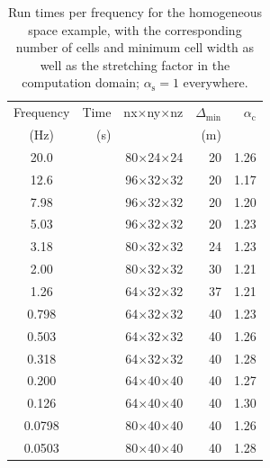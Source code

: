 \documentclass[onecolumn,extra,referee,camera]{gji}
\newlength{\twidth}
\newcommand{\mr}[1]{\mathrm{#1}}
\begin{document}
\begin{table}
\begin{minipage}{\twidth}
  \centering
  \caption{Run times per frequency for the homogeneous space example, with the
    corresponding number of cells and minimum cell width as well as the
    stretching factor in the computation domain; $\alpha_\mr{s}=1$ everywhere.}
  \label{tbl:timefull}
  \begin{tabular}{S[table-format=2.4]rrrr}
    \toprule
    {Frequency} & Time & nx$\times$ny$\times$nz & $\Delta_\mr{min}$ & $\alpha_\mr{c}$ \\
    {(Hz)}  & (s) &  & (m) & \\
    \midrule
    20.0    & & 80$\times$24$\times$24 & 20 & 1.26 \\
    12.6    & & 96$\times$32$\times$32 & 20 & 1.17 \\
     7.98   & & 96$\times$32$\times$32 & 20 & 1.20 \\
     5.03   & & 96$\times$32$\times$32 & 20 & 1.23 \\
     3.18   & & 80$\times$32$\times$32 & 24 & 1.23 \\
     2.00   & & 80$\times$32$\times$32 & 30 & 1.21 \\
     1.26   & & 64$\times$32$\times$32 & 37 & 1.21 \\
     0.798  & & 64$\times$32$\times$32 & 40 & 1.23 \\
     0.503  & & 64$\times$32$\times$32 & 40 & 1.26 \\
     0.318  & & 64$\times$32$\times$32 & 40 & 1.28 \\
     0.200  & & 64$\times$40$\times$40 & 40 & 1.27 \\
     0.126  & & 64$\times$40$\times$40 & 40 & 1.30 \\
     0.0798 & & 80$\times$40$\times$40 & 40 & 1.26 \\
     0.0503 & & 80$\times$40$\times$40 & 40 & 1.28 \\
    \bottomrule
  \end{tabular}
\end{minipage}
\end{table}
%
\end{document}
